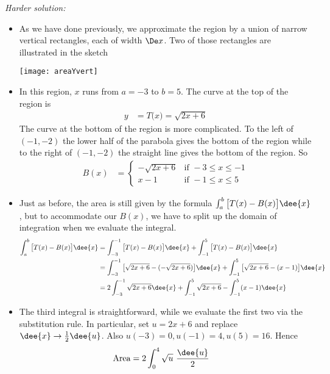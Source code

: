 \begin{eg}
\noindent\emph{Harder solution:}\\
\begin{itemize}
 \item As we have done previously, we approximate the region by a union of narrow
vertical rectangles, each of width $\De x$. Two of those rectangles are illustrated in
the sketch
\begin{efig}
\begin{center}
   \texttt{[image: areaYvert]}
\end{center}
\end{efig}
\item In this region, $x$ runs from $a=-3$ to $b=5$. The curve at the top of
the region is
\begin{align*}
y&=T\big(x)=\sqrt{2x+6}
\end{align*}
The curve at the bottom of the region is more complicated. To the left of $(-1,-2)$ the
lower half of the parabola gives the bottom of the region while to the right of $(-1,-2)$
the straight line gives the bottom of the region. So
\begin{align*}
B(x)&=\begin{cases}
           -\sqrt{2x+6} & \text{if } -3\le x\le -1 \\
           x-1 & \text{if }-1\le x\le 5
      \end{cases}
\end{align*}
\item Just as before, the area is still given by the formula $\int_a^b
\big[T(x)-B(x)\big]\dee{x}$, but to accommodate our $B(x)$, we have to split
up the domain of integration when we evaluate the integral.
\begin{align*}
\int_a^b \big[T(x)-B(x)\big]\dee{x}
  &=  \int_{-3}^{-1} \big[T(x)-B(x)\big]\dee{x}
          +\int_{-1}^5 \big[T(x)-B(x)\big]\dee{x} \\
  &= \int_{-3}^{-1} \big[\sqrt{2x+6}-(-\sqrt{2x+6})\big]\dee{x}
          +\int_{-1}^5 \big[\sqrt{2x+6}-(x-1)\big]\dee{x} \\
  &= 2\int_{-3}^{-1} \sqrt{2x+6}\dee{x}
          +\int_{-1}^5 \sqrt{2x+6} - \int_{-1}^5(x-1)\dee{x}
\end{align*}
\item The third integral is straightforward, while we evaluate the first two via the
substitution rule. In particular, set $u=2x+6$ and replace $\dee{x} \rightarrow
\frac{1}{2}\dee{u}$. Also $u(-3)=0, u(-1)=4, u(5)=16$. Hence
\begin{align*}
\text{Area}
  &= 2\int_0^4\sqrt{u}\ \frac{\dee{u}}{2}

\end{align*}
\end{itemize}
\end{eg}
